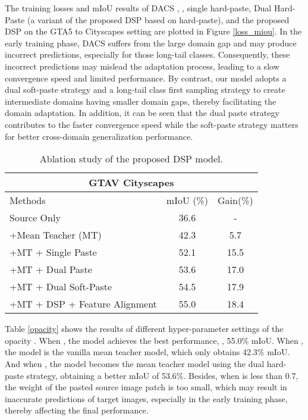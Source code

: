 \documentclass[sigconf]{acmart}
\begin{document}
The training losses and mIoU results of DACS \cite{dacs}, , single hard-paste, Dual Hard-Paste (a variant of the proposed DSP based on hard-paste), and the proposed DSP on the GTA5 to Cityscapes setting are plotted in Figure \ref{loss_miou}. In the early training phase, DACS suffers from the large domain gap and may produce incorrect predictions, especially for those long-tail classes. Consequently, these incorrect predictions may mislead the adaptation process, leading to a slow convergence speed and limited performance. By contrast, our model adopts a dual soft-paste strategy and a long-tail class first sampling strategy to create intermediate domains having smaller domain gaps, thereby facilitating the domain adaptation. In addition, it can be seen that the dual paste strategy contributes to the faster convergence speed while the soft-paste strategy matters for better cross-domain generalization performance. 

\begin{table}[htb]
    \centering
\begin{tabular}{l|c|c}

\hline

\multicolumn{3}{c}{GTAV  Cityscapes}\\
\hline
   Methods  & mIoU (\%)&Gain(\%) \\
   \hline
   \hline
   Source Only& 36.6&-\\
  +Mean Teacher (MT) &42.3&5.7\\
  +MT + Single Paste&52.1&15.5\\
  \hline
   +MT + Dual Paste& 53.6&17.0\\
   +MT + Dual Soft-Paste&54.5 &17.9\\
   +MT + DSP + Feature Alignment&55.0 &18.4\\
   \hline
\end{tabular}
    \caption{Ablation study of the proposed DSP model.}
    \label{ablation}
\end{table}


Table \ref{opacity} shows the results of different hyper-parameter settings of the opacity . When , the model achieves the best performance, , 55.0\% mIoU. When , the model is the vanilla mean teacher model, which only obtains 42.3\% mIoU. And when , the model becomes the mean teacher model using the dual hard-paste strategy, obtaining a better mIoU of 53.6\%. Besides, when  is less than 0.7, the weight of the pasted source image patch is too small, which may result in inaccurate predictions of target images, especially in the early training phase, thereby affecting the final performance. 
\end{document}

